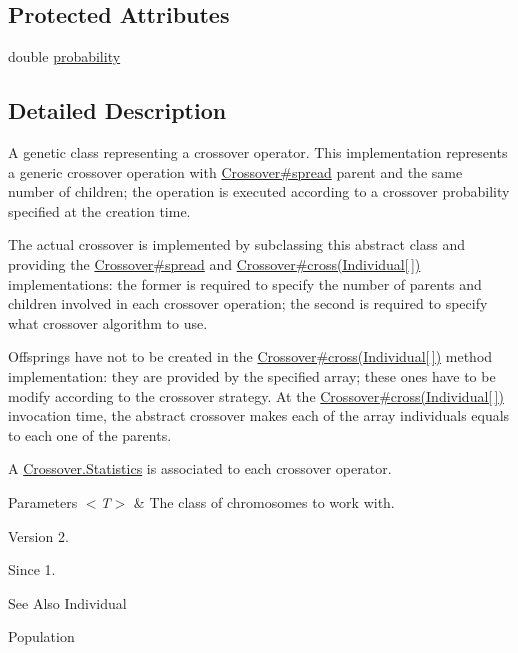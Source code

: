 \subsection*{Protected Attributes}
\begin{DoxyCompactItemize}
\item 
double \hyperlink{classjenes_1_1stage_1_1operator_1_1_crossover_3_01_t_01extends_01_chromosome_01_4_a2b4aec7312a223ba84862f7848b14542}{probability}
\end{DoxyCompactItemize}


\subsection{Detailed Description}
A genetic class representing a crossover operator. This implementation represents a generic crossover operation with \hyperlink{}{Crossover\#spread} parent and the same number of children; the operation is executed according to a crossover probability specified at the creation time. 

The actual crossover is implemented by subclassing this abstract class and providing the \hyperlink{}{Crossover\#spread} and \hyperlink{}{Crossover\#cross(\-Individual\mbox{[}$\,$\mbox{]})} implementations\-: the former is required to specify the number of parents and children involved in each crossover operation; the second is required to specify what crossover algorithm to use. 

Offsprings have not to be created in the \hyperlink{}{Crossover\#cross(\-Individual\mbox{[}$\,$\mbox{]})} method implementation\-: they are provided by the specified array; these ones have to be modify according to the crossover strategy. At the \hyperlink{}{Crossover\#cross(\-Individual\mbox{[}$\,$\mbox{]})} invocation time, the abstract crossover makes each of the array individuals equals to each one of the parents. 

A \hyperlink{}{Crossover.\-Statistics} is associated to each crossover operator.


\begin{DoxyParams}{Parameters}
{\em $<$\-T$>$} & The class of chromosomes to work with.\\
\hline
\end{DoxyParams}
\begin{DoxyVersion}{Version}
2. 
\end{DoxyVersion}
\begin{DoxySince}{Since}
1.
\end{DoxySince}
\begin{DoxySeeAlso}{See Also}
Individual 

Population 
\end{DoxySeeAlso}


